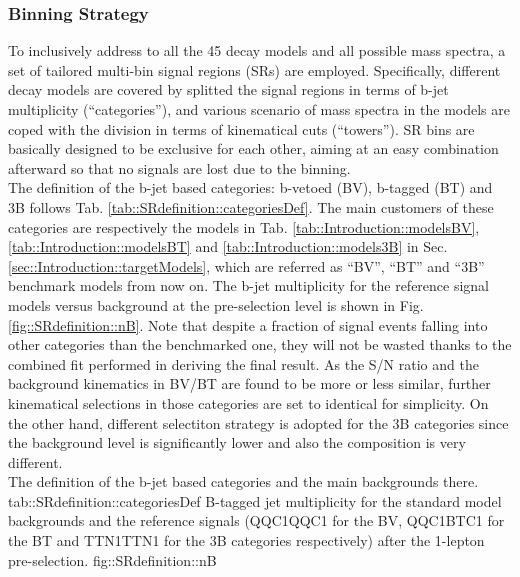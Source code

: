 \subsubsection{Binning Strategy}
To inclusively address to all the 45 decay models and all possible mass spectra, a set of tailored multi-bin signal regions (SRs) are employed.
Specifically, different decay models are covered by splitted the signal regions in terms of b-jet multiplicity (``categories''), 
and various scenario of mass spectra in the models are coped with the division in terms of kinematical cuts (``towers''). 
SR bins are basically designed to be exclusive for each other, aiming at an easy combination afterward so that no signals are lost due to the binning. \\

The definition of the b-jet based categories: b-vetoed (BV), b-tagged (BT) and 3B follows Tab. \ref{tab::SRdefinition::categoriesDef}. The main customers of these categories are respectively the models in Tab. \ref{tab::Introduction::modelsBV}, \ref{tab::Introduction::modelsBT} and \ref{tab::Introduction::models3B} in Sec. \ref{sec::Introduction::targetModels}, which are referred as ``BV'', ``BT'' and ``3B'' benchmark models from now on. 
The b-jet multiplicity for the reference signal models versus background at the pre-selection level is shown in Fig. \ref{fig::SRdefinition::nB}.
Note that despite a fraction of signal events falling into other categories than the benchmarked one, they will not be wasted thanks to the combined fit performed in deriving the final result.
As the S/N ratio and the background kinematics in BV/BT are found to be more or less similar, further kinematical selections in those categories are set to identical for simplicity. 
On the other hand, different selectiton strategy is adopted for the 3B categories since the background level is significantly lower and also the composition is very different. \\

{The definition of the b-jet based categories and the main backgrounds there.}
{tab::SRdefinition::categoriesDef}
{B-tagged jet multiplicity for the standard model backgrounds and the reference signals (QQC1QQC1 for the BV, QQC1BTC1 for the BT and TTN1TTN1 for the 3B categories respectively) after the 1-lepton pre-selection.}
{fig::SRdefinition::nB}

